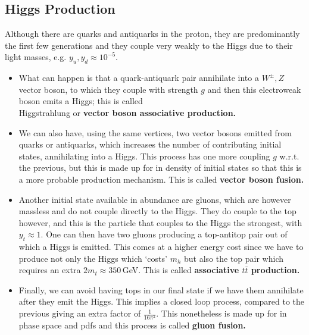 \documentclass[a4paper, 11pt, normalem]{report}
\begin{document}
\subsection{Higgs Production}
Although there are quarks and antiquarks in the proton, they are predominantly the first few generations and they couple very weakly to the Higgs due to their light masses, e.g. $y_u,y_d\approx10^{-5}$.
\begin{itemize}
    \item What can happen is that a quark-antiquark pair annihilate into a $W^\pm,Z$ vector boson, to which they couple with strength $g$ and then this electroweak boson emits a Higgs; this is called \\ Higgstrahlung or \textbf{vector boson associative production.}
    \item We can also have, using the same vertices, two vector bosons emitted from quarks or antiquarks, which increases the number of contributing initial states, annihilating into a Higgs.
        This process has one more coupling $g$ w.r.t. the previous, but this is made up for in density of initial states so that this is a more probable production mechanism.
        This is called \textbf{vector boson fusion.}
    \item Another initial state available in abundance are gluons, which are however massless and do not couple directly to the Higgs.
        They do couple to the top however, and this is the particle that couples to the Higgs the strongest, with $y_t\approx1$.
        One can then have two gluons producing a top-antitop pair out of which a Higgs is emitted.
        This comes at a higher energy cost since we have to produce not only the Higgs which `costs' $m_h$ but also the top pair which requires an extra $2m_t\approx350\,$GeV.
        This is called \textbf{associative $t\bar{t}$ production.}
    \item Finally, we can avoid having tops in our final state if we have them annihilate after they emit the Higgs.
        This implies a closed loop process, compared to the previous giving an extra factor of $\frac{1}{16\pi^2}$.
        This nonetheless is made up for in phase space and pdfs and this process is called \textbf{gluon fusion.}
\end{itemize}
\end{document}
